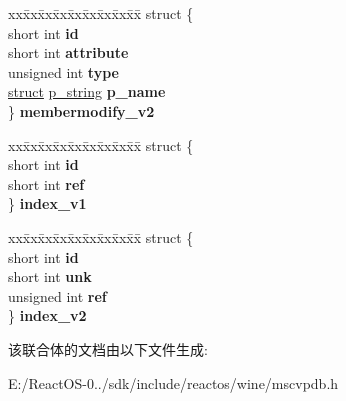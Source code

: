 \begin{DoxyCompactItemize}
\begin{tabbing}
\end{tabbing}\item 
\mbox{\label{unioncodeview__fieldtype_afa001553c8d8306a207c043e6f686467}} 
\begin{tabbing}
xx\=xx\=xx\=xx\=xx\=xx\=xx\=xx\=xx\=\kill
struct \{\\
\>short int {\bfseries id}\\
\>short int {\bfseries attribute}\\
\>unsigned int {\bfseries type}\\
\>\hyperlink{interfacestruct}{struct} \hyperlink{structp__string}{p\_string} {\bfseries p\_name}\\
\} {\bfseries membermodify\_v2}\\

\end{tabbing}\item 
\mbox{\label{unioncodeview__fieldtype_af8dab2cd6e6992d294712b78df8cbb0b}} 
\begin{tabbing}
xx\=xx\=xx\=xx\=xx\=xx\=xx\=xx\=xx\=\kill
struct \{\\
\>short int {\bfseries id}\\
\>short int {\bfseries ref}\\
\} {\bfseries index\_v1}\\

\end{tabbing}\item 
\mbox{\label{unioncodeview__fieldtype_a80c5ffbc15a9aafac77973952e9af7b1}} 
\begin{tabbing}
xx\=xx\=xx\=xx\=xx\=xx\=xx\=xx\=xx\=\kill
struct \{\\
\>short int {\bfseries id}\\
\>short int {\bfseries unk}\\
\>unsigned int {\bfseries ref}\\
\} {\bfseries index\_v2}\\

\end{tabbing}\end{DoxyCompactItemize}


该联合体的文档由以下文件生成\+:\begin{DoxyCompactItemize}
\item 
E\+:/\+React\+O\+S-\/0../sdk/include/reactos/wine/mscvpdb.\+h\end{DoxyCompactItemize}
